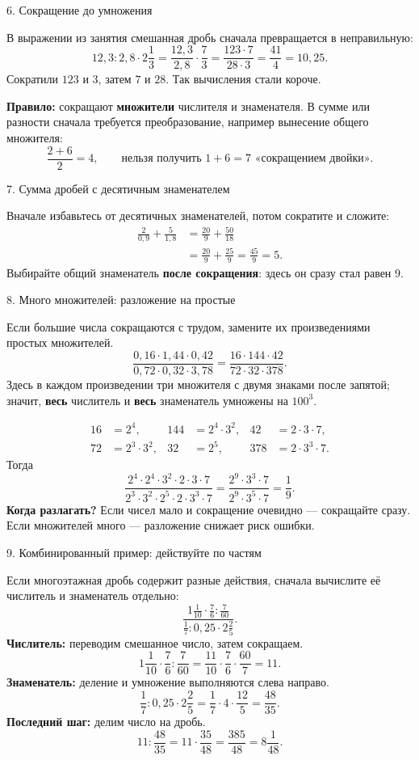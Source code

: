 \documentclass[a4paper,12pt]{article}
\newcommand{\sectionhead}[1]{%
  \needspace{4\baselineskip}
  \vspace{0.9\baselineskip}
  {\large\color{darkaccent}#1\par}
  \vspace{2pt}{\color{accent}\hrule height .5pt}\vspace{6pt}
}
\begin{document}
\sectionhead{6. Сокращение до умножения}
В выражении из занятия смешанная дробь сначала превращается в неправильную:
\[
12{,}3:2{,}8\cdot2\frac13
=\frac{12{,}3}{2{,}8}\cdot\frac73
=\frac{123\cdot7}{28\cdot3}
=\frac{41}{4}=10{,}25.
\]
Сократили $123$ и $3$, затем $7$ и $28$. Так вычисления стали короче.

\textbf{Правило:} сокращают \textbf{множители} числителя и знаменателя. В сумме или разности сначала требуется преобразование, например вынесение общего множителя:
\[
\frac{2+6}{2}=4,
\qquad \text{нельзя получить }1+6=7\text{ «сокращением двойки».}
\]

\sectionhead{7. Сумма дробей с десятичным знаменателем}
Вначале избавьтесь от десятичных знаменателей, потом сократите и сложите:
\begin{align*}
\frac2{0{,}9}+\frac5{1{,}8}
&=\frac{20}{9}+\frac{50}{18}\\
&=\frac{20}{9}+\frac{25}{9}
=\frac{45}{9}=5.
\end{align*}
Выбирайте общий знаменатель \textbf{после сокращения}: здесь он сразу стал равен $9$.

\sectionhead{8. Много множителей: разложение на простые}
Если большие числа сокращаются с трудом, замените их произведениями простых множителей.
\[
\frac{0{,}16\cdot1{,}44\cdot0{,}42}{0{,}72\cdot0{,}32\cdot3{,}78}
=\frac{16\cdot144\cdot42}{72\cdot32\cdot378}.
\]
Здесь в каждом произведении три множителя с двумя знаками после запятой; значит, \textbf{весь} числитель и \textbf{весь} знаменатель умножены на $100^3$.

\begin{align*}
16&=2^4, &144&=2^4\cdot3^2, &42&=2\cdot3\cdot7,\\
72&=2^3\cdot3^2, &32&=2^5, &378&=2\cdot3^3\cdot7.
\end{align*}
Тогда
\[
\frac{2^4\cdot 2^4\cdot3^2\cdot2\cdot3\cdot7}
{2^3\cdot3^2\cdot2^5\cdot2\cdot3^3\cdot7}
=\frac{2^9\cdot3^3\cdot7}{2^9\cdot3^5\cdot7}
=\boxed{\frac19}.
\]
\textbf{Когда разлагать?} Если чисел мало и сокращение очевидно --- сокращайте сразу. Если множителей много --- разложение снижает риск ошибки.

\sectionhead{9. Комбинированный пример: действуйте по частям}
Если многоэтажная дробь содержит разные действия, сначала вычислите её числитель и знаменатель отдельно:
\[
\frac{\displaystyle 1\frac1{10}\cdot\frac76:\frac7{60}}
{\displaystyle \frac17:0{,}25\cdot2\frac25}.
\]
\textbf{Числитель:} переводим смешанное число, затем сокращаем.
\[
1\frac1{10}\cdot\frac76:\frac7{60}
=\frac{11}{10}\cdot\frac76\cdot\frac{60}{7}=11.
\]
\textbf{Знаменатель:} деление и умножение выполняются слева направо.
\[
\frac17:0{,}25\cdot2\frac25
=\frac17\cdot4\cdot\frac{12}{5}=\frac{48}{35}.
\]
\textbf{Последний шаг:} делим число на дробь.
\[
11:\frac{48}{35}=11\cdot\frac{35}{48}
=\boxed{\frac{385}{48}=8\frac1{48}}.
\]
\end{document}
